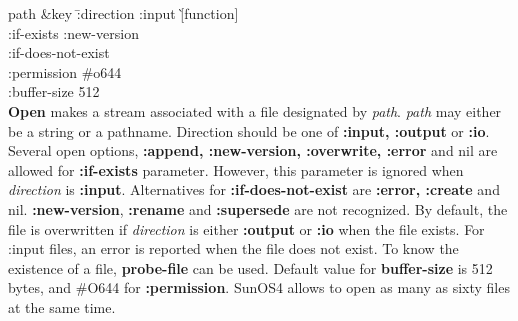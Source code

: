 \begin{refdesc}





{path \&key \= :direction :input \`[function]\\
 \> :if-exists :new-version \\
 \> :if-does-not-exist \\
 \> :permission \#o644 \\
 \> :buffer-size 512\\}{
{\bf Open} makes a stream associated with a file designated by {\em path}.
{\em path} may either be a string or a pathname.
Direction should be one of {\bf :input, :output} or {\bf :io}.
Several open options, {\bf :append, :new-version, :overwrite, :error}
and nil are allowed for {\bf :if-exists} parameter.
However, this parameter is ignored when {\em direction} is {\bf :input}.
Alternatives for {\bf :if-does-not-exist} are
{\bf :error, :create} and nil.
{\bf :new-version}, {\bf :rename} and {\bf :supersede}
are not recognized.
By default, the file is overwritten if {\em direction} is either
{\bf :output} or {\bf :io}  when the file exists.
For :input files, an error is reported when the file does not exist.
To know the existence of a file, {\bf probe-file} can be used.
Default value for {\bf buffer-size} is 512 bytes,
and \#O644 for {\bf :permission}.
SunOS4 allows to open as many as sixty files at the same time.
}




\end{refdesc}

